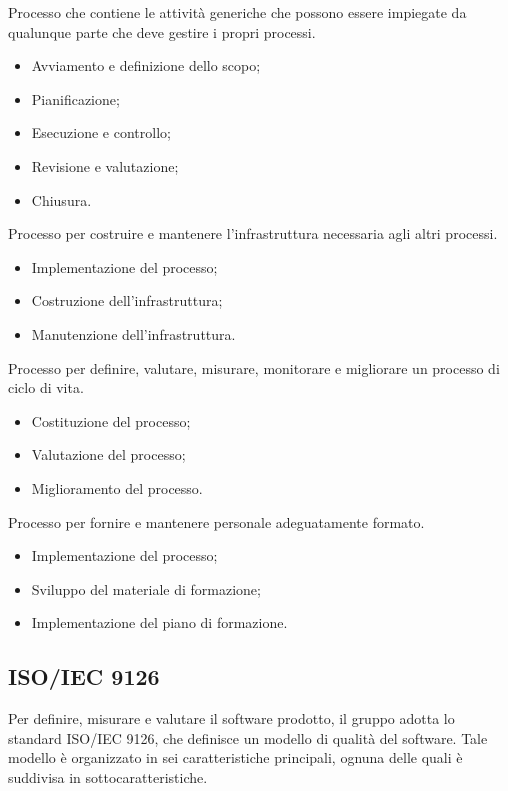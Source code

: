 Processo che contiene le attività generiche che possono 
essere impiegate da qualunque parte che deve gestire i propri processi.
\begin{itemize}
    \item Avviamento e definizione dello scopo;
    \item Pianificazione;
    \item Esecuzione e controllo;
    \item Revisione e valutazione;
    \item Chiusura.
\end{itemize}

Processo per costruire e mantenere l'infrastruttura necessaria
agli altri processi.
\begin{itemize}
    \item Implementazione del processo;
    \item Costruzione dell'infrastruttura;
    \item Manutenzione dell'infrastruttura.
\end{itemize}

Processo per definire, valutare, misurare, monitorare e migliorare
un processo di ciclo di vita.
\begin{itemize}
    \item Costituzione del processo;
    \item Valutazione del processo;
    \item Miglioramento del processo.
\end{itemize}

Processo per fornire e mantenere personale adeguatamente formato.
\begin{itemize}
    \item Implementazione del processo;
    \item Sviluppo del materiale di formazione;
    \item Implementazione del piano di formazione.
\end{itemize}

\subsection{ISO/IEC 9126}
Per definire, misurare e valutare il software prodotto, il gruppo adotta lo 
standard ISO/IEC 9126, che definisce un modello di qualità del software. Tale 
modello è organizzato in sei caratteristiche principali, 
ognuna delle quali è suddivisa in sottocaratteristiche.

